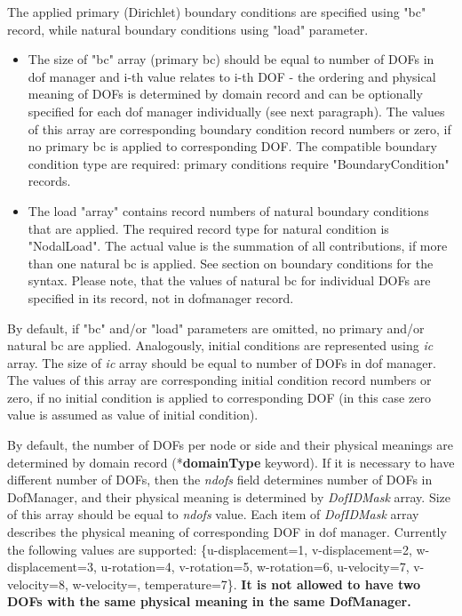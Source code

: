 \documentclass[a4paper]{article}
\newcommand{\param}[1]{{\em #1}}
\newcommand{\entKeyword}[1]{\mbox{{*{\bf{#1}}}}}
\begin{document}
The applied primary (Dirichlet) boundary conditions are specified using
"bc" record, while natural boundary conditions using "load" parameter.
\begin{itemize}
\item The size of "bc" array (primary bc) should be equal to number of DOFs in dof manager and i-th value relates to i-th DOF - the ordering and physical meaning of DOFs is determined by domain record and can be optionally specified for each dof manager individually (see next paragraph). The values of this array are corresponding boundary condition record numbers or zero, if no primary bc is applied to corresponding DOF. The compatible boundary condition type are required: primary conditions require "BoundaryCondition" records.
\item The load "array" contains record numbers of natural boundary conditions that are applied. The required record type for natural condition is "NodalLoad". The actual value is the summation of all contributions, if more than one natural bc is applied. See section on boundary conditions for the syntax. Please note, that the values of natural bc for individual DOFs are specified in its record, not in dofmanager record.
\end{itemize}

By default, if "bc" and/or "load" parameters are omitted, no primary
and/or natural bc are applied. Analogously, initial conditions are represented using \param{ic} array. The size of \param{ic} array should be equal to number of DOFs in dof manager. The values of this array are corresponding initial condition record numbers or zero, if no initial condition is applied to corresponding DOF (in this case zero value is assumed as value of initial condition).

By default, the number of DOFs per node or side  and their physical meanings are determined by domain record (\entKeyword{domainType} keyword).
If it is necessary to have
different number of DOFs, then the \param{ndofs} field
determines number of DOFs in DofManager, and their physical meaning is
determined by \param{DofIDMask} array. Size of this array
should be equal to \param{ndofs} value. Each item of \param{DofIDMask}
array describes the physical meaning of corresponding DOF in dof manager. Currently
the following values are supported: \{u-displacement=1, v-displacement=2,
 w-displacement=3, u-rotation=4, v-ro\-ta\-tion=5, w-rotation=6, u-velocity=7, v-velocity=8, w-velocity=, 
temperature=7\}. {\bf It is not allowed to have two DOFs
with the same physical meaning in the same DofManager.}
\end{document}
